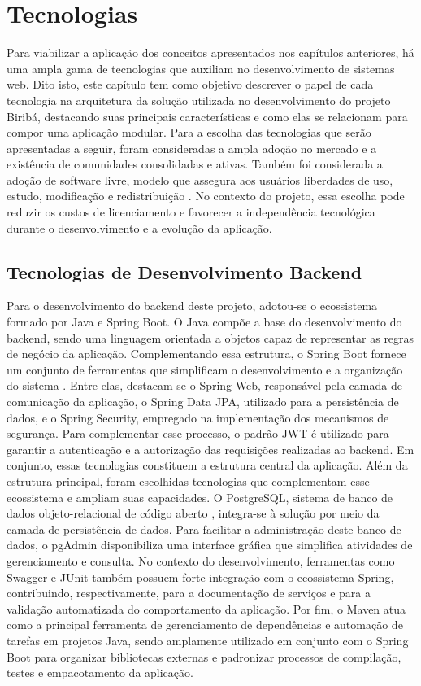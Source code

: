 \chapter{Tecnologias}
\label{chap2}
Para viabilizar a aplicação dos conceitos apresentados nos capítulos anteriores, há uma ampla gama de tecnologias que auxiliam no desenvolvimento de sistemas web.
Dito isto, este capítulo tem como objetivo descrever o papel de cada tecnologia na arquitetura da solução utilizada no desenvolvimento do projeto Biribá, destacando suas principais características e como elas se relacionam para compor uma aplicação modular.
Para a escolha das tecnologias que serão apresentadas a seguir, foram consideradas a ampla adoção no mercado e a existência de comunidades consolidadas e ativas. Também foi considerada a adoção de software livre, modelo que assegura aos usuários liberdades de uso, estudo, modificação e redistribuição \cite{silveira2004,gnu2026,fsf2026}. No contexto do projeto, essa escolha pode reduzir os custos de licenciamento e favorecer a independência tecnológica durante o desenvolvimento e a evolução da aplicação.

\section{Tecnologias de Desenvolvimento Backend}
Para o desenvolvimento do backend deste projeto, adotou-se o ecossistema formado por Java e Spring Boot. O Java compõe a base do desenvolvimento do backend, sendo uma linguagem orientada a objetos capaz de representar as regras de negócio da aplicação. Complementando essa estrutura, o Spring Boot fornece um conjunto de ferramentas que simplificam o desenvolvimento e a organização do sistema \cite{springboot2026}. Entre elas, destacam-se o Spring Web, responsável pela camada de comunicação da aplicação, o Spring Data JPA, utilizado para a persistência de dados, e o Spring Security, empregado na implementação dos mecanismos de segurança. Para complementar esse processo, o padrão JWT é utilizado para garantir a autenticação e a autorização das requisições realizadas ao backend. Em conjunto, essas tecnologias constituem a estrutura central da aplicação.
Além da estrutura principal, foram escolhidas tecnologias que complementam esse ecossistema e ampliam suas capacidades. O PostgreSQL, sistema de banco de dados objeto-relacional de código aberto \cite{postgresql2026}, integra-se à solução por meio da camada de persistência de dados. Para facilitar a administração deste banco de dados, o pgAdmin disponibiliza uma interface gráfica que simplifica atividades de gerenciamento e consulta. No contexto do desenvolvimento, ferramentas como Swagger e JUnit também possuem forte integração com o ecossistema Spring, contribuindo, respectivamente, para a documentação de serviços e para a validação automatizada do comportamento da aplicação. Por fim, o Maven atua como a principal ferramenta de gerenciamento de dependências e automação de tarefas em projetos Java, sendo amplamente utilizado em conjunto com o Spring Boot para organizar bibliotecas externas e padronizar processos de compilação, testes e empacotamento da aplicação.

